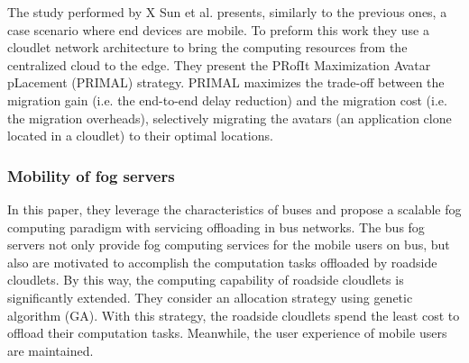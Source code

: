 \noindent\tab The study performed by X Sun et al. \cite{sun2016primal} presents, similarly to the previous ones, a case scenario where end devices are mobile. To preform this work they use a cloudlet network architecture to bring the computing resources from the centralized cloud to the edge. They present the PRofIt Maximization Avatar pLacement (PRIMAL) strategy. PRIMAL maximizes the trade-off between the migration gain (i.e. the end-to-end delay reduction) and the migration cost (i.e. the migration overheads), selectively migrating the avatars (an application clone located in a cloudlet) to their optimal locations.\\ %

\subsubsection{Mobility of fog servers}
\cite{ye2016scalable}
In this paper, they leverage the characteristics of buses and propose a scalable fog computing paradigm with servicing offloading in bus networks. The bus fog servers not only provide fog computing services for the mobile users on bus, but also are motivated to accomplish the computation tasks offloaded by roadside cloudlets. By this way, the computing capability of roadside cloudlets is significantly extended. They consider an allocation strategy using genetic algorithm (GA). With this strategy, the roadside cloudlets spend the least cost to offload their computation tasks. Meanwhile, the user experience of mobile users are maintained.


